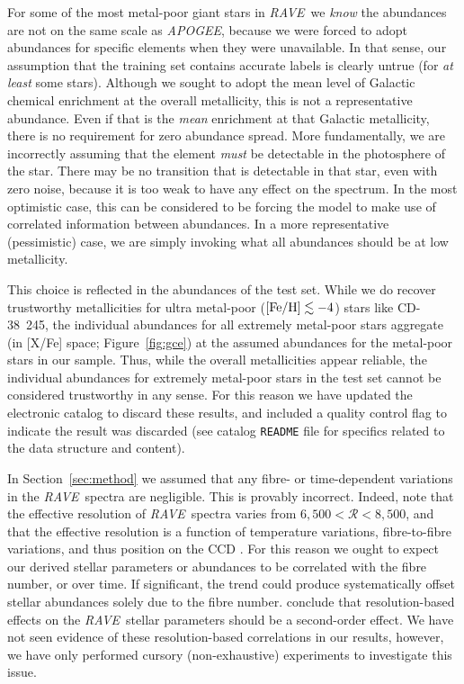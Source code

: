 \documentclass[preprint,trackchanges]{aastex}
\newcommand{\acronym}[1]{{\small{#1}}}
\newcommand{\project}[1]{\textsl{#1}}
\newcommand{\rave}{\project{\acronym{RAVE}}}
\newcommand{\apogee}{\project{\acronym{APOGEE}}}
\begin{document}
For some of the most metal-poor giant stars in \rave\, we \emph{know} the abundances 
are not on the same scale as \apogee, because we were forced to adopt abundances for 
specific elements when they were unavailable.  In that sense, our assumption that the
training set contains accurate labels is clearly untrue (for \emph{at least} some stars).
Although we sought to adopt the mean
level of Galactic chemical enrichment at the overall metallicity, this is not a
representative abundance. Even if that is the \emph{mean} enrichment at that Galactic
metallicity, there is no requirement for zero abundance spread.
More fundamentally, we are incorrectly assuming that the element \emph{must} be 
detectable in the photosphere of the star.  There may be no transition that is 
detectable in that star, even with zero noise, because it is too weak to have any 
effect on the spectrum.  In the most optimistic case, this can be considered to be
forcing the model to make use of correlated information between abundances.  In a
more representative (pessimistic) case, we are simply invoking what all abundances
should be at low metallicity.


This choice is reflected in the abundances of the test set.  While we do recover
trustworthy metallicities for ultra metal-poor ($[{\rm Fe/H}] \lesssim -4$) stars like 
CD-38~245, the individual abundances for all extremely metal-poor stars aggregate
(in [X/Fe] space; Figure~\ref{fig:gce}) at the assumed abundances for the metal-poor
stars in our sample.  Thus, while the overall metallicities appear reliable, the 
individual abundances for extremely metal-poor stars in the test set cannot be
considered trustworthy in any sense.  For this reason we have updated the electronic
catalog to discard these results, and included a quality control flag to indicate
the result was discarded (see catalog \texttt{README} file for specifics related to
the data structure and content).


In Section~\ref{sec:method} we assumed that any fibre- or time-dependent variations
in the \rave\ spectra are negligible.  This is provably incorrect. Indeed,
\citet{Kordopatis_2013} note that the effective resolution of \rave\
spectra varies from $6{,}500 < \mathcal{R} < 8{,}500$, and that the 
effective resolution is a function of temperature variations, fibre-to-fibre
variations, and thus position on the CCD \citep{Steinmetz_2006}.
 For this reason we ought to expect our derived stellar
parameters or abundances to be correlated with the fibre number, or over
time.  If significant, the trend could produce systematically offset
stellar abundances solely due to the fibre number.  \citet{Kordopatis_2013}
conclude that resolution-based effects on the \rave\ stellar parameters
should be a second-order effect. We have not seen evidence of these 
resolution-based correlations in our results, however, we have only
performed cursory (non-exhaustive) experiments to investigate this issue.
\end{document}
